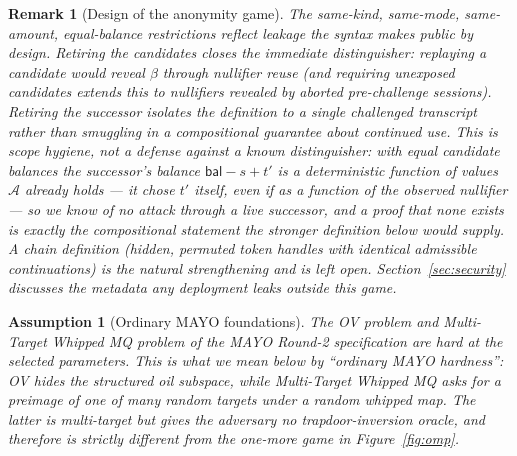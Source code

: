 \documentclass[11pt]{article}
\newtheorem{assumption}{Assumption}
\newtheorem{remark}{Remark}
\newcommand{\adv}{\mathcal{A}}
\begin{document}
\begin{remark}[Design of the anonymity game]
\label{rem:anon}
The same-kind, same-mode, same-amount, equal-balance restrictions reflect
leakage the syntax makes public by design. Retiring the \emph{candidates}
closes the immediate distinguisher: replaying a candidate would reveal
$\beta$ through nullifier reuse (and requiring unexposed candidates
extends this to nullifiers revealed by \emph{aborted} pre-challenge
sessions). Retiring the \emph{successor} isolates the definition to a
single challenged transcript rather than smuggling in a compositional
guarantee about continued use. This is scope hygiene, not a defense
against a known distinguisher: with equal candidate balances the
successor's balance $\mathsf{bal} - s + t'$ is a deterministic function
of values $\adv$ already holds --- it chose $t'$ itself, even if as a
function of the observed nullifier --- so we know of no attack through a
live successor, and a proof that none exists is exactly the compositional
statement the stronger definition below would supply. A chain definition
(hidden, permuted token handles with identical admissible continuations)
is the natural strengthening and is left open. Section~\ref{sec:security} discusses the metadata any
deployment leaks outside this game.
\end{remark}

\begin{assumption}[Ordinary MAYO foundations]
\label{ass:mayo}
The OV problem and Multi-Target Whipped MQ problem of the MAYO Round-2
specification are hard at the selected parameters.  This is what we mean
below by ``ordinary MAYO hardness'': OV hides the structured oil subspace,
while Multi-Target Whipped MQ asks for a preimage of one of many random
targets under a random whipped map.  The latter is multi-target but gives
the adversary no trapdoor-inversion oracle, and therefore is strictly
different from the one-more game in Figure~\ref{fig:omp}.
\end{assumption}
\end{document}
